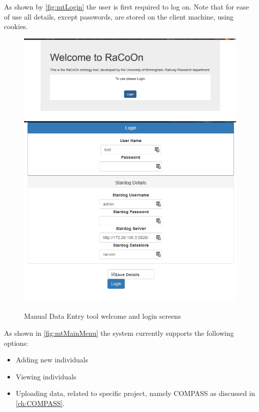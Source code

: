 As shown by \autoref{fig:mtLogin} the user is first required to log on. Note that for ease of use all details, except passwords, are stored on the client machine, using cookies.

 \begin{figure}[H]
\includegraphics[max height=\textheight,max width=\linewidth]{gfx/manToolWelcome}
\includegraphics[max height=0.5\textheight,max width=\linewidth]{gfx/manToolLogin}
\caption{Manual Data Entry tool welcome and login screens}
\label{fig:mtLogin}
\end{figure}

As shown in \autoref{fig:mtMainMenu} the system currently supports the following options:
\begin{itemize}
	\item Adding new individuals
	\item Viewing individuals
	\item Uploading data, related to specific project, namely COMPASS as discussed in \autoref{ch:COMPASS}. 
\end{itemize}

